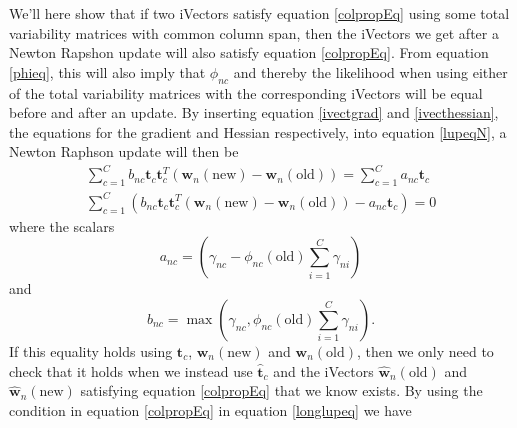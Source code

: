 We'll here show that if two iVectors satisfy equation \ref{colpropEq} using some total variability matrices with common column span, then the iVectors we get after a Newton Rapshon update will also satisfy equation \ref{colpropEq}. From equation \ref{phieq}, this will also imply that $\phi_{nc}$ and thereby the likelihood when using either of the total variability matrices with the corresponding iVectors will be equal before and after an update. By inserting equation \ref{ivectgrad} and \ref{ivecthessian}, the equations for the gradient and Hessian respectively, into equation \ref{lupeqN}, a Newton Raphson update will then be
\begin{align}
\sum_{c=1}^C b_{nc} \mathbf{t}_c \mathbf{t}_c^T(\mathbf{w}_n(\text{new})-\mathbf{w}_n(\text{old})) = \sum_{c=1}^C a_{nc} \mathbf{t}_c \nonumber \\
\sum_{c=1}^C \left(b_{nc} \mathbf{t}_c \mathbf{t}_c^T(\mathbf{w}_n(\text{new})-\mathbf{w}_n(\text{old})) - a_{nc} \mathbf{t}_c\right) = 0 \label{longlupeq}
\end{align}
where the scalars
\begin{equation*}
a_{nc} = \left(\gamma_{nc}-\phi_{nc}(\text{old})\sum_{i=1}^C \gamma_{ni} \right)
\end{equation*}
and
\begin{equation*}
b_{nc} = \max\left(\gamma_{nc}, \phi_{nc}(\text{old})\sum_{i=1}^C \gamma_{ni} \right).
\end{equation*}
If this equality holds using $\mathbf{t}_c$, $\mathbf{w}_n(\text{new})$ and $\mathbf{w}_n(\text{old})$, then we only need to check that it holds when we instead use $\mathbf{\hat{t}}_c$ and the iVectors $\mathbf{\hat{w}}_n(\text{old})$ and $\mathbf{\hat{w}}_n(\text{new})$ satisfying equation \ref{colpropEq} that we know exists. By using the condition in equation \ref{colpropEq} in equation \ref{longlupeq} we have

